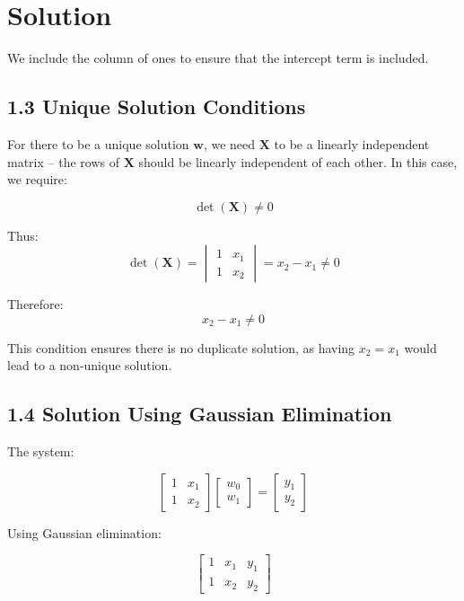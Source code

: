 \documentclass{../harvardml}
\theoremstyle{definition}
\theoremstyle{plain}
\newenvironment{solution}
  {\color{blue}\section*{Solution}}
{}
\begin{document}
\begin{solution}
    We include the column of ones to ensure that the intercept term is included.

    \subsection*{1.3 Unique Solution Conditions}
        For there to be a unique solution $\bm{w}$, we need $\bm{X}$ to be a linearly independent matrix -- the rows of $\bm{X}$ should be linearly independent of each other. In this case, we require:

        \begin{equation}
            \det(\bm{X}) \neq 0
        \end{equation}

        Thus:
        \begin{equation}
            \det(\bm{X}) = \begin{vmatrix}
                1 & x_1 \\
                1 & x_2
            \end{vmatrix} = x_2 - x_1 \neq 0
        \end{equation}

        Therefore:
        \[
        x_2 - x_1 \neq 0
        \]

        This condition ensures there is no duplicate solution, as having $x_2 = x_1$ would lead to a non-unique solution.

            
    \subsection*{1.4 Solution Using Gaussian Elimination}
    
    The system:
    
    \[
    \begin{bmatrix}
        1 & x_1 \\
        1 & x_2
    \end{bmatrix}
    \begin{bmatrix}
        w_0 \\
        w_1
    \end{bmatrix}
    =
    \begin{bmatrix}
        y_1 \\
        y_2
    \end{bmatrix}
    \]
    
    Using Gaussian elimination:
    
    \[
    \begin{bmatrix}
        1 & x_1 & y_1 \\
        1 & x_2 & y_2
    \end{bmatrix}
    \]
    

\end{solution}
\end{document}
